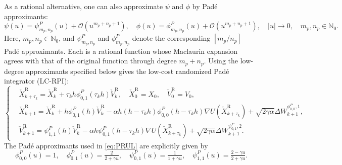 \documentclass[12pt]{article}
\numberwithin{equation}{section}
\newcommand{\U}{\nabla U}
\begin{document}
As a rational alternative, one can also approximate $\psi$ and $\phi$ by
Pad\'e approximants:
\begin{equation}
\psi (u) 
=
\psi^P_{m_p,n_p}(u)
+
\mathcal{O}
(u^{m_p+n_p+1})
,
\quad
\phi (u)
= 
\phi^P_{m_p,n_p}(u)
+
\mathcal{O}
(u^{m_p+n_p+1})
,
\quad
|u| \to 0,
\quad
m_p,n_p
\in 
\mathbb{N}_0
.
\end{equation}
Here, $m_p,n_p\in\mathbb N_0$, and
$\psi_{m_p,n_p}^P$ and $\phi_{m_p,n_p}^P$ denote the corresponding
$[m_p/n_p]$ Pad\'e approximants. Each is a rational function whose
Maclaurin expansion agrees with that of the original function
through degree $m_p+n_p$. Using the low-degree approximants
specified below gives the low-cost randomized Pad\'e integrator
(LC-RPI):
\begin{equation}\label{eq:PRUL}
\left\{
\begin{aligned}
& 
\check{X}^{\mathrm{R}}_{k+\tau_k}
=
\check{X}^{\mathrm{R}}_k
+
\tau_kh \phi^P_{0,1}(\tau_k h)\check{V}^{\mathrm{R}}_k,
\quad 
\check{X}^{\mathrm{R}}_{0}
=
X_0,
\quad 
\check{V}^{\mathrm{R}}_{0}
=
V_0,
\\
& 
\check{X}^{\mathrm{R}}_{k+1}
=
\check{X}^{\mathrm{R}}_k
+
h\phi^P_{0,1}(h)
\check{V}^{\mathrm{R}}_k
-
\alpha h(h-\tau_k h) \phi^P_{0,0}(h-\tau_k h)
\U(\check{X}^{\mathrm{R}}_{k+\tau_k})
+
\sqrt{2\gamma\alpha}
\Delta W_{k+1}^{\phi^P_{0,0},1}, \\
&  
\check{V}^{\mathrm{R}}_{k+1}
= 
\psi^P_{1,1}(h)\check{V}^{\mathrm{R}}_k
-
\alpha h \psi^P_{0,1}(h-\tau_k h) \U(\check{X}^{\mathrm{R}}_{k+\tau_k})
+
\sqrt{2\gamma\alpha}
\Delta W_{k+1}^{\psi^P_{0,1},2}.
\end{aligned}
\right.
\end{equation}
The Pad\'e approximants used in \eqref{eq:PRUL} are explicitly given by
\begin{equation}\label{eq:pade-poly}
\phi^{P}_{0,0}(u)=1,
\quad
\phi^{P}_{0,1}(u)
=
\tfrac{2}{2+\gamma u},
\quad
\psi^{P}_{0,1}(u)
=
\tfrac{1}{1+\gamma u},
\quad
\psi^{P}_{1,1}(u)
=
\tfrac{2-\gamma u}{2+\gamma u}.
\end{equation}
\end{document}
